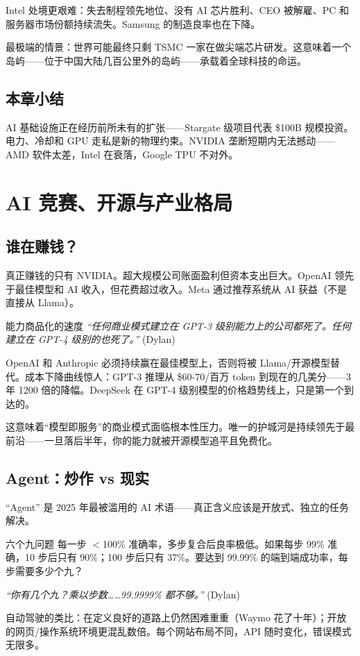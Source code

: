 \documentclass[a4paper]{article}
\begin{document}
Intel 处境更艰难：失去制程领先地位、没有 AI 芯片胜利、CEO 被解雇、PC 和服务器市场份额持续流失。Samsung 的制造良率也在下降。

最极端的情景：世界可能最终只剩 TSMC 一家在做尖端芯片研发。这意味着一个岛屿——位于中国大陆几百公里外的岛屿——承载着全球科技的命运。

\subsection{本章小结}

AI 基础设施正在经历前所未有的扩张——Stargate 级项目代表 \$100B 规模投资。电力、冷却和 GPU 走私是新的物理约束。NVIDIA 垄断短期内无法撼动——AMD 软件太差，Intel 在衰落，Google TPU 不对外。

\section{AI 竞赛、开源与产业格局}

\subsection{谁在赚钱？}

真正赚钱的只有 NVIDIA。超大规模公司账面盈利但资本支出巨大。OpenAI 领先于最佳模型和 AI 收入，但花费超过收入。Meta 通过推荐系统从 AI 获益（不是直接从 Llama）。

\begin{warningbox}{能力商品化的速度}
\textit{``任何商业模式建立在 GPT-3 级别能力上的公司都死了。任何建立在 GPT-4 级别的也死了。''} (Dylan)

OpenAI 和 Anthropic 必须持续赢在最佳模型上，否则将被 Llama/开源模型替代。成本下降曲线惊人：GPT-3 推理从 \$60-70/百万 token 到现在的几美分——3 年 1200 倍的降幅。DeepSeek 在 GPT-4 级别模型的价格趋势线上，只是第一个到达的。

这意味着``模型即服务''的商业模式面临根本性压力。唯一的护城河是持续领先于最前沿——一旦落后半年，你的能力就被开源模型追平且免费化。
\end{warningbox}

\subsection{Agent：炒作 vs 现实}

``Agent'' 是 2025 年最被滥用的 AI 术语——真正含义应该是开放式、独立的任务解决。

\begin{knowledgebox}{六个九问题}
每一步 $<$100\% 准确率，多步复合后良率极低。如果每步 99\% 准确，10 步后只有 90\%；100 步后只有 37\%。要达到 99.99\% 的端到端成功率，每步需要多少个九？

\textit{``你有几个九？乘以步数……99.9999\% 都不够。''} (Dylan)

自动驾驶的类比：在定义良好的道路上仍然困难重重（Waymo 花了十年）；开放的网页/操作系统环境更混乱数倍。每个网站布局不同，API 随时变化，错误模式无限多。
\end{knowledgebox}
\end{document}
